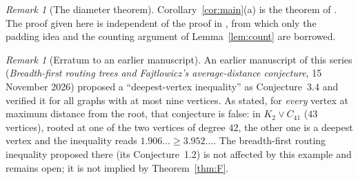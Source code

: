 \documentclass[11pt,a4paper]{article}
\theoremstyle{definition}
\theoremstyle{remark}
\newtheorem{remark}[theorem]{Remark}
\numberwithin{equation}{section}
\begin{document}
\begin{remark}[The diameter theorem]
Corollary~\ref{cor:main}(a) is the theorem of \cite{DLS}. The proof given here is
independent of the proof in \cite{DLS}, from which only the padding idea and the
counting argument of Lemma~\ref{lem:count} are borrowed.
\end{remark}

\begin{remark}[Erratum to an earlier manuscript]
An earlier manuscript of this series (\emph{Breadth-first routing trees and
Fajtlowicz's average-distance conjecture}, 15 November 2026) proposed a
``deepest-vertex inequality'' as Conjecture~3.4 and verified it for all graphs with
at most nine vertices. As stated, for \emph{every} vertex at maximum distance from
the root, that conjecture is false: in $K_2\vee C_{41}$ ($43$ vertices), rooted at
one of the two vertices of degree $42$, the other one is a deepest vertex and the
inequality reads $1.906\ldots\ge3.952\ldots$. The breadth-first routing inequality
proposed there (its Conjecture~1.2) is not affected by this example and remains
open; it is not implied by Theorem~\ref{thm:F}.
\end{remark}
\end{document}
